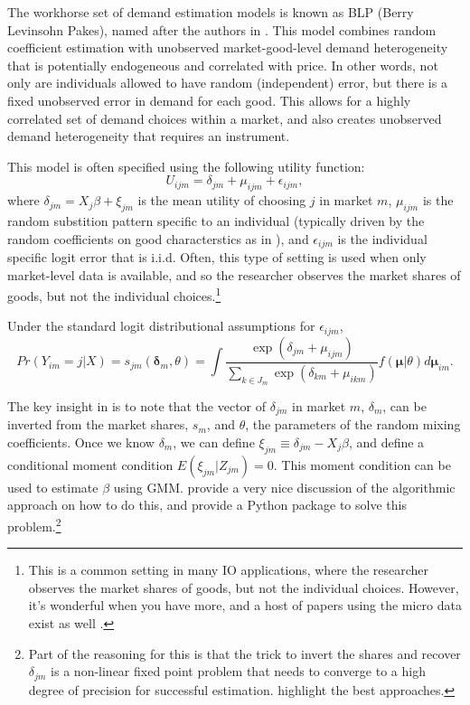 \documentclass{tufte-handout}
\theoremstyle{break}
\begin{document}
The workhorse set of demand estimation models is known as BLP (Berry  Levinsohn Pakes), named after the authors in \citet{berry1995automobile}. This model combines random coefficient estimation with unobserved market-good-level demand heterogeneity that is potentially endogeneous and correlated with price. In other words, not only are individuals allowed to have random (independent) error, but there is a fixed unobserved error in demand for each good. This allows for a highly correlated set of demand choices within a market, and also creates unobserved demand heterogeneity that requires an instrument.

This model is often specified using the following utility function:          
\begin{equation}
  U_{ijm} =\delta_{jm}  +  \mu_{ijm} + \epsilon_{ijm}, 
\end{equation}
where $\delta_{jm} = X_{j}\beta + \xi_{jm}$ is the mean utility of choosing $j$ in market $m$, $\mu_{ijm}$ is the random substition pattern specific to an individual (typically driven by the random coefficients on good characterstics as in ),  and $\epsilon_{ijm}$ is the individual specific logit error that is i.i.d. Often, this type of setting is used when only market-level data is available, and so the researcher observes the market shares of goods, but not the individual choices.\footnote{This is a common setting in many IO applications, where the researcher observes the market shares of goods, but not the individual choices. However, it's wonderful when you have more, and a host of papers using the micro data exist as well \citep{berry2004differentiated, conlon2023incorporating}.}

Under the standard logit distributional assumptions for $\epsilon_{ijm}$,
\begin{equation}
  Pr(Y_{im} = j | X) = s_{jm}(\boldsymbol{\delta}_{m}, \theta) = \int \frac{\exp(\delta_{jm} + \mu_{ijm})}{\sum_{k \in J_{m}} \exp(\delta_{km} + \mu_{ikm})} f(\boldsymbol{\mu}|\theta) d \boldsymbol{\mu}_{im}.
\end{equation}

The key insight in \citet{berry1995automobile} is to note that the vector of $\delta_{jm}$ in market $m$, $\delta_{m}$, can be inverted from the market shares, $s_{m}$, and $\theta$, the parameters of the random mixing coefficients. Once we know $\delta_{m}$, we can define $\xi_{jm} \equiv \delta_{jm} - X_{j}\beta$, and define a conditional moment condition $E(\xi_{jm} | Z_{jm}) = 0$. This moment condition can be used to estimate $\beta$ using GMM. \citet{conlon2020best} provide a very nice discussion of the algorithmic approach on how to do this, and provide a Python package to solve this problem.\footnote{Part of the reasoning for this is that the trick to invert the shares and recover $\delta_{jm}$ is a non-linear fixed point problem that needs to converge to a high degree of precision for successful estimation. \citet{conlon2020best} highlight the best approaches.} 
\end{document}
